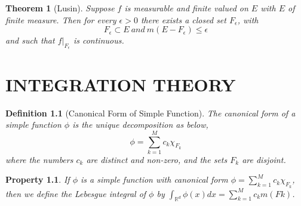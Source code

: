 \documentclass{report}
\newtheorem{thm}{Theorem}
\newtheorem{defn}{Definition}
\newtheorem{property}{Property}
\newcommand{\reals}{\mathbb{R}}
\begin{document}
\begin{thm}[Lusin]
	Suppose $f$ is measurable and finite valued on $E$ with $E$ of finite measure. Then for every $\epsilon > 0$ there exists a closed set $F_\epsilon$, with
	$$F_\epsilon \subset E\ and\ m(E - F_\epsilon) \leq \epsilon$$
	and such that $f|_{F_\epsilon}$ is continuous.
\end{thm}

\chapter{INTEGRATION THEORY}
\begin{defn}[Canonical Form of Simple Function]
	The canonical form of a simple function $\phi$ is the unique decomposition as below,
	$$  \phi = \sum_{k=1}^{M} c_k \chi_{F_k}  $$
	 where the numbers $c_k$ are distinct and non-zero, and the sets $F_k$ are disjoint.
\end{defn}
\begin{property}
	If $\phi$ is a simple function with canonical form $  \phi = \sum_{k=1}^{M} c_k \chi_{F_k}  $, then we define the Lebesgue integral of $\phi$ by $\int_{\reals^d}^{} \phi(x) dx = \sum_{k=1}^{M} c_k m(Fk)$.
\end{property}
\end{document}
